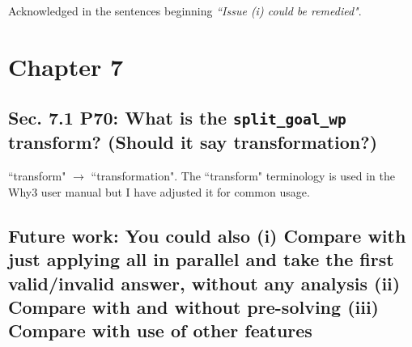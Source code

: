 \documentclass[]{article}
\begin{document}
Acknowledged in the sentences beginning \emph{``Issue (i) could be remedied"}. 

\section{Chapter 7}

\subsection{Sec. 7.1 P70: What is the \texttt{split\_goal\_wp} transform? (Should it say transformation?)}

``transform" $\rightarrow$ ``transformation". The ``transform" terminology is used in the \textsf{Why3} user manual but I have adjusted it for common usage. 

\subsection{Future work: You could also (i) Compare with just applying all in parallel and take the first valid/invalid answer,	without any analysis (ii) Compare with and without pre-solving (iii) Compare with use of other features}
\end{document}
